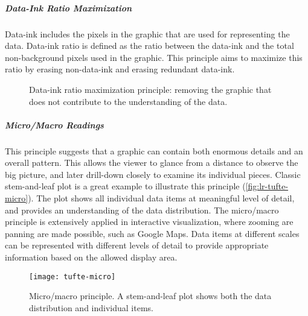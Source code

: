 \subparagraph{Data-Ink Ratio Maximization}
Data-ink includes the pixels in the graphic that are used for representing the data. Data-ink ratio is defined as the ratio between the data-ink and the total non-background pixels used in the graphic. This principle aims to maximize this ratio by erasing non-data-ink and erasing redundant data-ink.

\begin{figure}[!htb]
\centering
{} 
\hfill
{} 
\caption{Data-ink ratio maximization principle: removing the graphic that does not contribute to the understanding of the data.}
\label{fig:lr-tufte-ink}
\end{figure}

\subparagraph{Micro/Macro Readings}
This principle suggests that a graphic can contain both enormous details and an overall pattern. This allows the viewer to glance from a distance to observe the big picture, and later drill-down closely to examine its individual pieces. Classic stem-and-leaf plot is a great example to illustrate this principle (\autoref{fig:lr-tufte-micro}). The plot shows all individual data items at meaningful level of detail, and provides an understanding of the data distribution. The micro/macro principle is extensively applied in interactive visualization, where zooming are panning are made possible, such as Google Maps. Data items at different scales can be represented with different levels of detail to provide appropriate information based on the allowed display area.

\begin{figure}[!htb]
	\centering
	\texttt{[image: tufte-micro]}
	\caption{Micro/macro principle. A stem-and-leaf plot shows both the data distribution and individual items. }
	\label{fig:lr-tufte-micro}
\end{figure}



